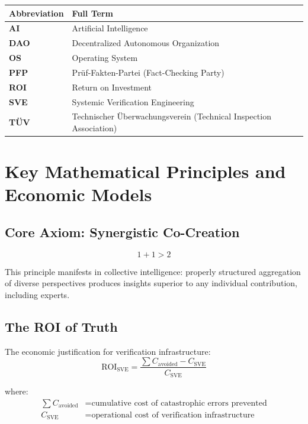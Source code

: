 \documentclass[11pt,a4paper]{article}
\begin{document}
\begin{small}
\begin{tabular}{@{}>{\bfseries}ll@{}}
\toprule
\normalfont\textbf{Abbreviation} & \textbf{Full Term} \\
\midrule
AI & Artificial Intelligence \\
DAO & Decentralized Autonomous Organization \\
OS & Operating System \\
PFP & Prüf-Fakten-Partei (Fact-Checking Party) \\
ROI & Return on Investment \\
SVE & Systemic Verification Engineering \\
TÜV & Technischer Überwachungsverein (Technical Inspection Association) \\
\bottomrule
\end{tabular}

\vspace{1cm}

\section*{Key Mathematical Principles and Economic Models}

\subsection*{Core Axiom: Synergistic Co-Creation}
\begin{equation}
1 + 1 > 2
\label{eq:synergy}
\end{equation}

\noindent This principle manifests in collective intelligence: properly structured aggregation of diverse perspectives produces insights superior to any individual contribution, including experts.

\subsection*{The ROI of Truth}
The economic justification for verification infrastructure:
\begin{equation}
\text{ROI}_{\text{SVE}} = \frac{\sum C_{\text{avoided}} - C_{\text{SVE}}}{C_{\text{SVE}}}
\label{eq:roi}
\end{equation}

where:
\begin{align*}
\sum C_{\text{avoided}} &= \text{cumulative cost of catastrophic errors prevented} \\
C_{\text{SVE}} &= \text{operational cost of verification infrastructure}
\end{align*}


\end{small}
\end{document}
